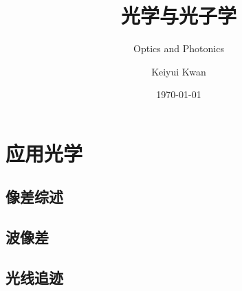 \documentclass[cn,10pt,chinesefont=founder,math=mtpro2,cite=super,toc=onecol,twoside]{elegantbook}
\title{光学与光子学}
\subtitle{\huge{Optics and Photonics}}
\author{Keiyui Kwan}
\institute{Zhejiang University}
\date{\today}
\begin{document}
	
\maketitle

\frontmatter


\tableofcontents

\mainmatter

\part{应用光学}



















\chapter{像差综述}

\chapter{波像差}

\chapter{光线追迹}







\end{document}
